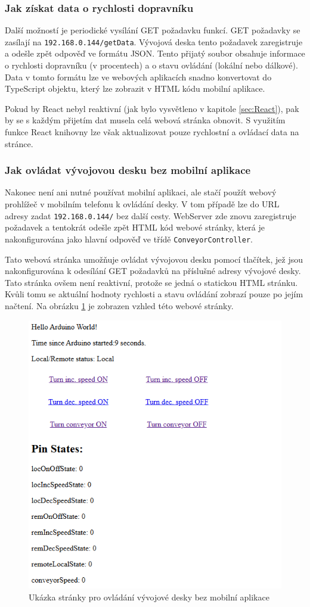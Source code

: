 \subsubsection{Jak získat data o rychlosti dopravníku}
Další možností je periodické vysílání GET požadavku funkcí. GET požadavky se zasílají na \texttt{192.168.0.144/getData}. Vývojová deska tento požadavek zaregistruje a odešle zpět odpověď ve formátu JSON. Tento přijatý soubor obsahuje informace o rychlosti dopravníku (v procentech) a o stavu ovládání (lokální nebo dálkové). Data v tomto formátu lze ve webových aplikacích snadno konvertovat do TypeScript objektu, který lze zobrazit v HTML kódu mobilní aplikace.

Pokud by React nebyl reaktivní (jak bylo vysvětleno v kapitole \ref{sec:React}), pak by se s každým přijetím dat musela celá webová stránka obnovit. S využitím funkce React knihovny lze však aktualizovat pouze rychlostní a ovládací data na stránce.

\subsubsection{Jak ovládat vývojovou desku bez mobilní aplikace}\label{sec:JakOvladatBezMobilniAplikace}
Nakonec není ani nutné používat mobilní aplikaci, ale stačí použít webový prohlížeč v mobilním telefonu k ovládání desky. V tom případě lze do URL adresy zadat \texttt{192.168.0.144/} bez další cesty. WebServer zde znovu zaregistruje požadavek a tentokrát odešle zpět HTML kód webové stránky, která je nakonfigurována jako hlavní odpověď ve třídě \texttt{Con\-ve\-yor\-Con\-tro\-ller}.

Tato webová stránka umožňuje ovládat vývojovou desku pomocí tlačítek, jež jsou nakonfigurována k odesílání GET požadavků na příslušné adresy vývojové desky. Tato stránka ovšem není reaktivní, protože se jedná o statickou HTML stránku. Kvůli tomu se aktuální hodnoty rychlosti a stavu ovládání zobrazí pouze po jejím načtení. Na obrázku \ref{fig:WebServerLandingPage} je zobrazen vzhled této webové stránky.

\begin{figure}[hptb]
	\centering
	\includegraphics[width=0.6\linewidth]{images/WebServerLandingPage.png}
	\caption{Ukázka stránky pro ovládání vývojové desky bez mobilní aplikace}
	\label{fig:WebServerLandingPage}
\end{figure}

